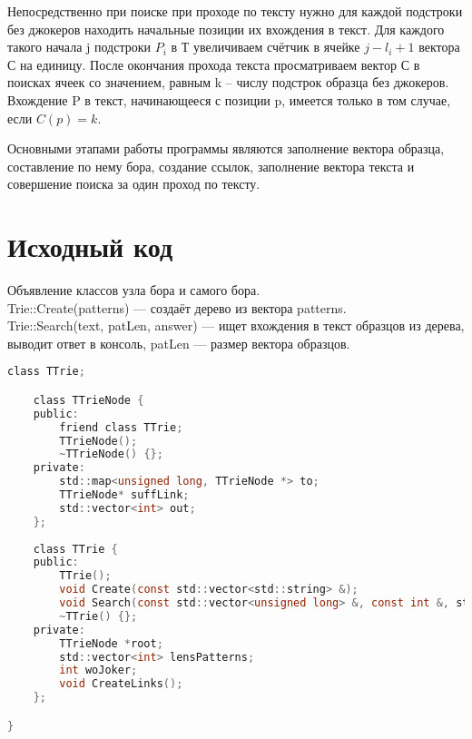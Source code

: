 Непосредственно при поиске при проходе по тексту нужно для каждой подстроки без джокеров находить начальные позиции их вхождения в текст. Для каждого такого начала j подстроки $P_i$ в Т увеличиваем счётчик в ячейке $j-l_i+1$ вектора С на единицу. После окончания прохода текста просматриваем вектор С в поисках ячеек со значением, равным k -- числу подстрок образца без джокеров. Вхождение P в текст, начинающееся с позиции p, имеется только в том случае, если $C(p) = k$.

Основными этапами работы программы являются заполнение вектора образца, составление по нему бора, создание ссылок, заполнение вектора текста и совершение поиска за один проход по тексту.


\pagebreak

\section{Исходный код}
Объявление классов узла бора и самого бора.\\
{\ttfamily Trie::Create(patterns)} --- создаёт дерево из вектора patterns.\\
{\ttfamily Trie::Search(text, patLen, answer)} --- ищет вхождения в текст образцов из дерева, выводит ответ в консоль, patLen --- размер вектора образцов.\\

\begin{lstlisting}[language=C]
	class TTrie;

	class TTrieNode {
	public:
		friend class TTrie;
		TTrieNode();
		~TTrieNode() {};
	private:
		std::map<unsigned long, TTrieNode *> to;
		TTrieNode* suffLink;
		std::vector<int> out;
	};
	
	class TTrie {
	public:
		TTrie();
		void Create(const std::vector<std::string> &);
		void Search(const std::vector<unsigned long> &, const int &, std::vector<std::pair<int, int>> &);
		~TTrie() {};
	private:
		TTrieNode *root;
		std::vector<int> lensPatterns;
		int woJoker;
		void CreateLinks();
	};

}
	
\end{lstlisting}

\pagebreak

